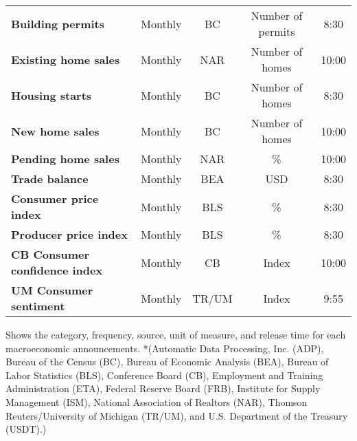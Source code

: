 \begin{table}[]
\begin{center}
\begin{tabular}{@{}lcccc@{}}
\textbf{Building permits}                 & Monthly            & BC              & Number of permits & 8:30          \\
\textbf{Existing home sales}              & Monthly            & NAR             & Number of homes   & 10:00         \\
\textbf{Housing starts}                   & Monthly            & BC              & Number of homes   & 8:30          \\
\textbf{New home sales}                   & Monthly            & BC              & Number of homes   & 10:00         \\
\textbf{Pending home sales}               & Monthly            & NAR             & \%                & 10:00         \\
\textbf{Trade balance}                    & Monthly            & BEA             & USD               & 8:30          \\
\textbf{Consumer price index}             & Monthly            & BLS             & \%                & 8:30          \\
\textbf{Producer price index}             & Monthly            & BLS             & \%                & 8:30          \\
\textbf{CB Consumer confidence index}     & Monthly            & CB              & Index             & 10:00         \\
\textbf{UM Consumer sentiment}            & Monthly            & TR/UM           & Index             & 9:55          \\ \bottomrule
\end{tabular}
\end{center}
\begin{tablenotes}
        \singlespacing
        \footnotesize
Shows the category, frequency, source, unit of measure, and release time for each macroeconomic announcements.  *(Automatic Data Processing, Inc. (ADP), Bureau of the Census (BC), Bureau of Economic Analysis (BEA), Bureau of Labor Statistics (BLS), Conference Board (CB), Employment and Training Administration (ETA), Federal Reserve Board (FRB), Institute for Supply Management (ISM), National Association of Realtors (NAR), Thomson Reuters/University of Michigan (TR/UM), and U.S. Department of the Treasury (USDT).)
\end{tablenotes}
\end{table}


